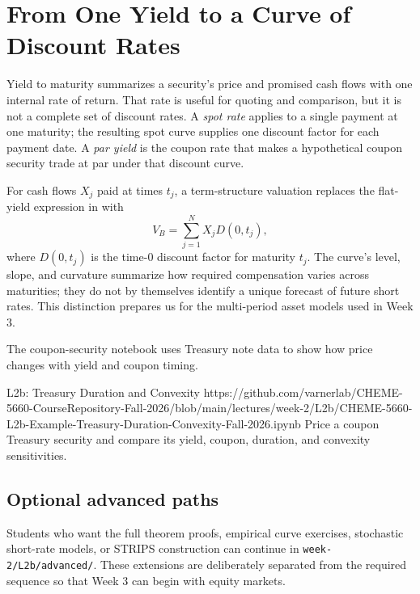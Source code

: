 \documentclass[11pt]{article}
\newcommand{\B}{V_{B}}
\begin{document}
\section{From One Yield to a Curve of Discount Rates}

Yield to maturity summarizes a security's price and promised cash flows with one
internal rate of return. That rate is useful for quoting and comparison, but it
is not a complete set of discount rates. A \emph{spot rate} applies to a
single payment at one maturity; the resulting spot curve supplies one discount
factor for each payment date. A \emph{par yield} is the coupon rate that makes a
hypothetical coupon security trade at par under that discount curve.

For cash flows $X_j$ paid at times $t_j$, a term-structure valuation replaces
the flat-yield expression in  with
\begin{equation}
  \label{eq:spot-curve-price}
  \B=\sum_{j=1}^{N}X_jD(0,t_j),
\end{equation}
where $D(0,t_j)$ is the time-0 discount factor for maturity $t_j$. The curve's
level, slope, and curvature summarize how required compensation varies across
maturities; they do not by themselves identify a unique forecast of future
short rates. This distinction prepares us for the multi-period asset models used
in Week 3.

The coupon-security notebook uses Treasury note data to show how price changes with yield and coupon timing.

\newpage
\thispagestyle{fancy}
\notebooklink
  {L2b: Treasury Duration and Convexity}
  {https://github.com/varnerlab/CHEME-5660-CourseRepository-Fall-2026/blob/main/lectures/week-2/L2b/CHEME-5660-L2b-Example-Treasury-Duration-Convexity-Fall-2026.ipynb}
  {Price a coupon Treasury security and compare its yield, coupon, duration, and convexity sensitivities.}

\subsection*{Optional advanced paths}

Students who want the full theorem proofs, empirical curve exercises, stochastic
short-rate models, or STRIPS construction can continue in
\texttt{week-2/L2b/advanced/}. These extensions are deliberately separated from
the required sequence so that Week 3 can begin with equity markets.
\end{document}
